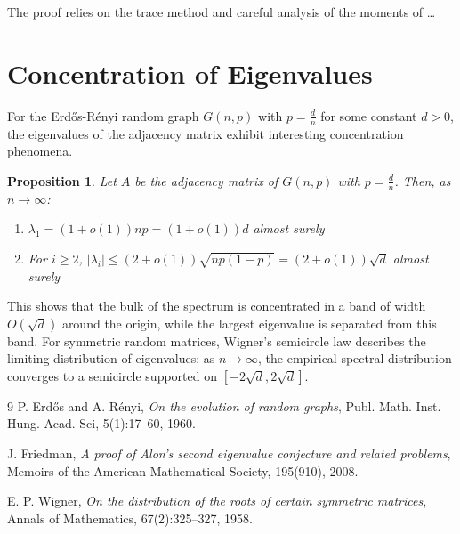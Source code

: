 \documentclass[12pt,a4paper]{article}
\newtheorem{proposition}[theorem]{Proposition}
\begin{document}
The proof relies on the trace method and careful analysis of the moments of \dots

\section{Concentration of Eigenvalues}
For the Erdős-Rényi random graph $G(n,p)$ with $p = \frac{d}{n}$ for some constant $d > 0$, the eigenvalues of the adjacency matrix exhibit interesting concentration phenomena.

\begin{proposition}
    Let $A$ be the adjacency matrix of $G(n,p)$ with $p = \frac{d}{n}$. Then, as $n \to \infty$:
    \begin{enumerate}
        \item $\lambda_1 = (1+o(1))np = (1+o(1))d$ almost surely
        \item For $i \ge 2$, $|\lambda_i| \leq (2+o(1))\sqrt{np(1-p)} = (2+o(1))\sqrt{d}$ almost surely
    \end{enumerate}
\end{proposition}

This shows that the bulk of the spectrum is concentrated in a band of width $O(\sqrt{d})$ around the origin, while the largest eigenvalue is separated from this band. For symmetric random matrices, Wigner's semicircle law \cite{wigner1958distribution} describes the limiting distribution of eigenvalues: as $n \to \infty$, the empirical spectral distribution converges to a semicircle supported on $[-2\sqrt{d}, 2\sqrt{d}]$.


\begin{thebibliography}{9}
    P. Erdős and A. Rényi,
    \textit{On the evolution of random graphs},
    Publ. Math. Inst. Hung. Acad. Sci, 5(1):17--60, 1960.

    J. Friedman,
    \textit{A proof of Alon's second eigenvalue conjecture and related problems},
    Memoirs of the American Mathematical Society, 195(910), 2008.

    E. P. Wigner,
    \textit{On the distribution of the roots of certain symmetric matrices},
    Annals of Mathematics, 67(2):325--327, 1958.

\end{thebibliography}
\end{document}
